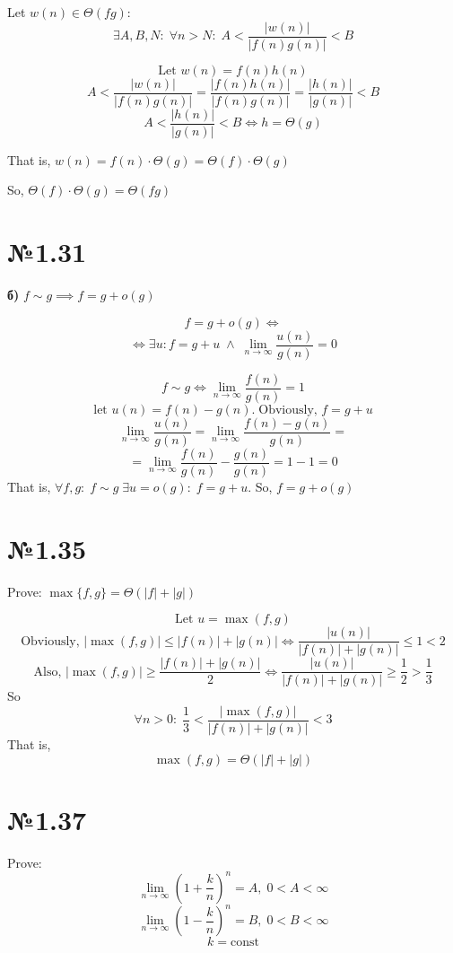 \documentclass[11pt, a4paper]{article} %
\begin{document}
Let $w(n) \in \Theta(fg)$:
$$\exists A,B,N:\; \forall n>N:\; A<\frac{|w(n)|}{|f(n)g(n)|}<B$$

$$\text{Let } w(n) = f(n)h(n)$$
$$A < \frac{|w(n)|}{|f(n)g(n)|} = \frac{|f(n)h(n)|}{|f(n)g(n)|} = \frac{|h(n)|}{|g(n)|} < B$$
$$A < \frac{|h(n)|}{|g(n)|} < B \iff h = \Theta(g)$$

That is, $w(n) = f(n) \cdot \Theta(g) = \Theta(f) \cdot \Theta(g)$

So, $\Theta(f)\cdot\Theta(g) = \Theta(fg)$\qedsymbol


\section*{№1.31}
\begin{mdframed}
    \textbf{б)} $f \sim g \implies f = g + o(g)$
\end{mdframed}

$$f = g + o(g) \iff$$
$$\iff \exists u: f=g+u \;\wedge\; \underset{n\to \infty}{\lim} \frac{u(n)}{g(n)} = 0$$

$$f \sim g \iff \underset{n\to \infty}{\lim} \frac{f(n)}{g(n)} = 1$$
$$\text{let } u(n) = f(n)-g(n).\;\text{Obviously, } f = g+u$$
$$\underset{n\to \infty}{\lim} \frac{u(n)}{g(n)} = \underset{n\to \infty}{\lim} \frac{f(n) - g(n)}{g(n)} =$$
$$= \underset{n\to \infty}{\lim} \frac{f(n)}{g(n)} - \frac{g(n)}{g(n)} = 1 - 1 = 0$$
That is, $\forall f,g:\; f\sim g\; \exists u=o(g):\; f = g + u$.
So, $f = g+o(g)$\qedsymbol

\section*{№1.35}
\begin{mdframed}
    Prove: $\max\{f,g\} = \Theta(|f| + |g|)$
\end{mdframed}

$$\text{Let } u = \max(f,g)$$
$$\text{Obviously, } |\max(f,g)| \le |f(n)|+|g(n)| \iff \frac{|u(n)|}{|f(n)|+|g(n)|} \le 1 < 2$$
$$\text{Also, } |\max(f,g)| \ge \frac{|f(n)|+|g(n)|}{2} \iff \frac{|u(n)|}{|f(n)|+|g(n)|} \ge \frac{1}{2} > \frac{1}{3}$$
So
$$\forall n>0:\; \frac{1}{3} < \frac{|\max(f,g)|}{|f(n)|+|g(n)|} < 3$$
That is, $$\max(f,g) = \Theta(|f|+|g|)$$\qedsymbol

\section*{№1.37}
\begin{mdframed}
    Prove: 
    $$\underset{n\to\infty}{\lim}\left(1+\frac{k}{n}\right)^n = A,\; 0<A<\infty$$
    $$\underset{n\to\infty}{\lim}\left(1-\frac{k}{n}\right)^n = B,\; 0<B<\infty$$
    $$k = \text{const}$$
\end{mdframed}
\end{document}
